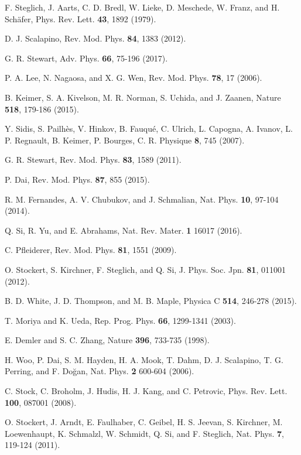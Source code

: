 \documentclass[aps,prl,onecolumn,amsmath,amssymb,superscriptaddress]{revtex4}
\begin{document}
\begin{thebibliography}{}
 F. Steglich, J. Aarts, C. D. Bredl, W. Lieke, D. Meschede, W. Franz, and H. Sch\"{a}fer, Phys. Rev. Lett. {\bf 43}, 1892 (1979).

 D. J. Scalapino, Rev. Mod. Phys. {\bf 84}, 1383 (2012).

 G. R. Stewart, Adv. Phys. {\bf 66}, 75-196 (2017). 	

 P. A. Lee, N. Nagaosa, and X. G. Wen, Rev. Mod. Phys. {\bf 78}, 17 (2006).

 B. Keimer, S. A. Kivelson, M. R. Norman, S. Uchida, and J. Zaanen, Nature {\bf 518}, 179-186 (2015).

 Y. Sidis, S. Pailh\`{e}s, V. Hinkov, B. Fauqu\'{e}, C. Ulrich,
L. Capogna, A. Ivanov, L. P. Regnault, B. Keimer, P. Bourges, C. R. Physique {\bf 8}, 745 (2007).

 G. R. Stewart, Rev. Mod. Phys. {\bf 83}, 1589 (2011). 	

 P. Dai, Rev. Mod. Phys. {\bf 87}, 855 (2015).

 R. M. Fernandes, A. V. Chubukov, and J. Schmalian, Nat. Phys. {\bf 10}, 97-104 (2014).

 Q. Si, R. Yu, and E. Abrahams, Nat. Rev. Mater. {\bf 1} 16017 (2016).

 C. Pfleiderer, Rev. Mod. Phys. {\bf 81}, 1551 (2009).

 O. Stockert, S. Kirchner, F. Steglich, and Q. Si, J. Phys. Soc. Jpn. {\bf 81}, 011001 (2012).

 B. D. White, J. D. Thompson, and M. B. Maple, Physica C {\bf 514}, 246-278 (2015).

 T. Moriya and K. Ueda, Rep. Prog. Phys. {\bf 66}, 1299-1341 (2003).

 E. Demler and S. C. Zhang, Nature {\bf 396}, 733-735 (1998).

 H. Woo, P. Dai, S. M. Hayden, H. A. Mook, T. Dahm, D. J. Scalapino, T. G. Perring, and F. Do\u{g}an, Nat. Phys. {\bf 2} 600-604 (2006). 

 C. Stock, C. Broholm, J. Hudis, H. J. Kang, and C. Petrovic, Phys. Rev. Lett. {\bf 100}, 087001 (2008).

 O. Stockert, J. Arndt, E. Faulhaber, C. Geibel, H. S. Jeevan, S. Kirchner, M. Loewenhaupt, K. Schmalzl, W. Schmidt, Q. Si, and F. Steglich, Nat. Phys. {\bf 7}, 119-124 (2011).


\end{thebibliography}
\end{document}
